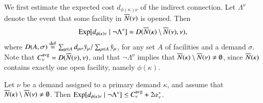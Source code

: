 We first estimate the expected cost $d_{\phi(\kappa)\nu}$ of the indirect
connection. Let $\Lambda^\nu$ denote the event that some 
facility in ${\overline{N}}(\nu)$ is opened. Then
%
\begin{equation}
	\mbox{\rm Exp}[ d_{\phi(\kappa)\nu} \mid \neg\Lambda^\nu] 
			= D({\overline{N}}(\kappa) \setminus {\overline{N}}(\nu), \nu),
			\label{eqn: expected indirect connection}
\end{equation}
%
where $D(A,\sigma) \stackrel{\mathrm{def}}{=}\sum_{\mu\in A}
d_{\mu\sigma}{\bar y}_{\mu}/\sum_{\mu\in A} {\bar y}_{\mu}$, for
any set $A$ of facilities and a demand $\sigma$.  Note that
$C^{{\mbox{\scriptsize\rm avg}}}_\nu = D({\overline{N}}(\nu),\nu)$, and that $\neg\Lambda^\nu$
implies that ${\overline{N}}(\kappa) \setminus
{\overline{N}}(\nu)\neq\emptyset$, since ${\overline{N}}(\kappa)$ contains
exactly one open facility, namely $\phi(\kappa)$.


\begin{lemma}
  \label{lem:echu indirect}
  Let $\nu$ be a demand assigned to a primary demand $\kappa$, and
assume that ${\overline{N}}(\kappa) \setminus {\overline{N}}(\nu)\neq\emptyset$.
Then $\mbox{\rm Exp}[ d_{\phi(\kappa)\nu} \mid \neg\Lambda^\nu]  \leq
  		C^{{\mbox{\scriptsize\rm avg}}}_\nu+2\alpha_{\nu}^\ast$.
\end{lemma}

